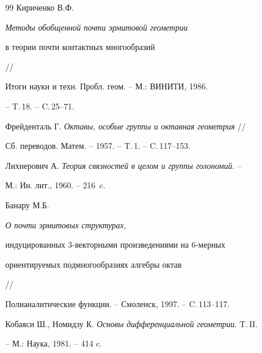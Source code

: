 \begin{thebibliography}{99}
Кириченко В.Ф. {\em Методы обобщенной почти эрмитовой геометрии 


в теории почти контактных многообразий} // 


Итоги науки и техн. Пробл. геом. -- М.: ВИНИТИ, 1986.


-- T.\,18. -- C.\,25--71.




Фрейденталь Г. {\em Октавы, особые группы и октавная геометрия} // 


Сб. переводов. Матем. -- 1957. -- T.\,1. -- C.\,117--153.




Лихнерович А. {\em Теория связностей в целом и группы голономий}. --


М.: Ин. лит., 1960. -- 216~c.




Банару М.Б. {\em О почти эрмитовых структурах, 


индуцированных $3$-векторными произведениями на $6$-мерных


ориентируемых подмногообразиях алгебры октав} // 


Полианалитические функции. -- Смоленск, 1997. -- C.\,113--117.




Кобаяси Ш., Номидзу К. {\em Основы дифференциальной геометрии}. T.\,II.


-- М.: Наука, 1981. -- 414 c.





\end{thebibliography}





\vskip 2cm












\label{end}





